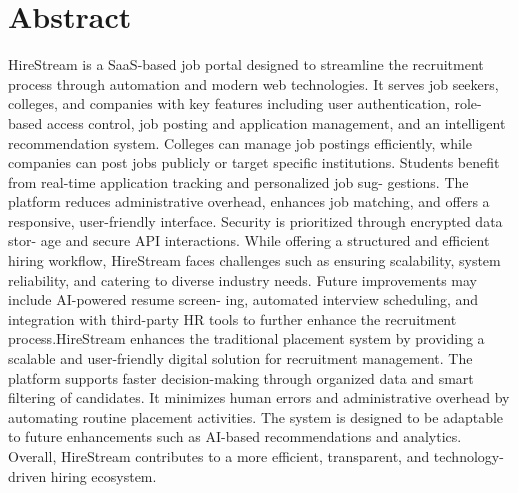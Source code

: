 \documentclass[a4paper, 12pt]{report}
\begin{document}
\chapter*{Abstract}
\thispagestyle{borderedpage}
HireStream is a SaaS-based job portal designed to streamline the recruitment process through automation and modern web technologies. It serves job seekers, colleges, and companies with key features including user authentication, role-based access control, job posting and application management, and an intelligent recommendation system. Colleges can manage job postings efficiently, while companies can post jobs publicly or target specific institutions. Students benefit from real-time application tracking and personalized job sug- gestions. The platform reduces administrative overhead, enhances job matching, and offers a responsive, user-friendly interface. Security is prioritized through encrypted data stor- age and secure API interactions. While offering a structured and efficient hiring workflow, HireStream faces challenges such as ensuring scalability, system reliability, and catering to diverse industry needs. Future improvements may include AI-powered resume screen- ing, automated interview scheduling, and integration with third-party HR tools to further enhance the recruitment process.HireStream enhances the traditional placement system by providing a scalable and user-friendly digital solution for recruitment management. The platform supports faster decision-making through organized data and smart filtering of candidates. It minimizes human errors and administrative overhead by automating routine placement activities. The system is designed to be adaptable to future enhancements such as AI-based recommendations and analytics. Overall, HireStream contributes to a more efficient, transparent, and technology-driven hiring ecosystem.


\newpage

\pagestyle{borderedpage}

\tableofcontents
\thispagestyle{titlepagelayout}
\newpage

{
\doublespacing
\listoffigures
\thispagestyle{titlepagelayout}
\newpage
\doublespacing
\listoftables
\thispagestyle{titlepagelayout}
\newpage
\restoregeometry
}



\setcounter{page}{1}
\end{document}
